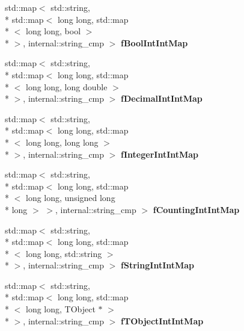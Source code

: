 \begin{DoxyCompactItemize}
\item 
\hypertarget{class_h_a_l_1_1_analysis_data_a4d6c6e21427e94fe1a53f524cf0fbbc5}{std\-::map$<$ std\-::string, \\*
std\-::map$<$ long long, std\-::map\\*
$<$ long long, bool $>$\\*
 $>$, internal\-::string\-\_\-cmp $>$ {\bfseries f\-Bool\-Int\-Int\-Map}}\label{class_h_a_l_1_1_analysis_data_a4d6c6e21427e94fe1a53f524cf0fbbc5}

\item 
\hypertarget{class_h_a_l_1_1_analysis_data_a48a5faced1a93d3f912b95314b0eb9f2}{std\-::map$<$ std\-::string, \\*
std\-::map$<$ long long, std\-::map\\*
$<$ long long, long double $>$\\*
 $>$, internal\-::string\-\_\-cmp $>$ {\bfseries f\-Decimal\-Int\-Int\-Map}}\label{class_h_a_l_1_1_analysis_data_a48a5faced1a93d3f912b95314b0eb9f2}

\item 
\hypertarget{class_h_a_l_1_1_analysis_data_ae0a0427f6204ac11136c141f56a8bb03}{std\-::map$<$ std\-::string, \\*
std\-::map$<$ long long, std\-::map\\*
$<$ long long, long long $>$\\*
 $>$, internal\-::string\-\_\-cmp $>$ {\bfseries f\-Integer\-Int\-Int\-Map}}\label{class_h_a_l_1_1_analysis_data_ae0a0427f6204ac11136c141f56a8bb03}

\item 
\hypertarget{class_h_a_l_1_1_analysis_data_ad50906057dfe2e1cda6756218f549201}{std\-::map$<$ std\-::string, \\*
std\-::map$<$ long long, std\-::map\\*
$<$ long long, unsigned long \\*
long $>$ $>$, internal\-::string\-\_\-cmp $>$ {\bfseries f\-Counting\-Int\-Int\-Map}}\label{class_h_a_l_1_1_analysis_data_ad50906057dfe2e1cda6756218f549201}

\item 
\hypertarget{class_h_a_l_1_1_analysis_data_ac06bbfebb1b319a3b17407c3a5bc17c2}{std\-::map$<$ std\-::string, \\*
std\-::map$<$ long long, std\-::map\\*
$<$ long long, std\-::string $>$\\*
 $>$, internal\-::string\-\_\-cmp $>$ {\bfseries f\-String\-Int\-Int\-Map}}\label{class_h_a_l_1_1_analysis_data_ac06bbfebb1b319a3b17407c3a5bc17c2}

\item 
\hypertarget{class_h_a_l_1_1_analysis_data_ac743254719039aa3af1d33b6a2558499}{std\-::map$<$ std\-::string, \\*
std\-::map$<$ long long, std\-::map\\*
$<$ long long, T\-Object $\ast$ $>$\\*
 $>$, internal\-::string\-\_\-cmp $>$ {\bfseries f\-T\-Object\-Int\-Int\-Map}}\label{class_h_a_l_1_1_analysis_data_ac743254719039aa3af1d33b6a2558499}

\end{DoxyCompactItemize}


